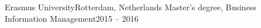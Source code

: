 \resumeSubheading
  {Erasmus University}{Rotterdam, Netherlands}
  {Master's degree, Business Information Management}{2015 – 2016} 